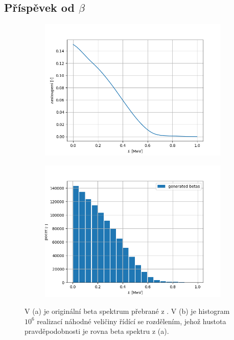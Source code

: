 \documentclass[11pt,a4paper]{article}
\begin{document}
\subsection{Příspěvek od $\beta$}
\begin{figure}[H]
	\centering
	\begin{subfigure}{0.49\textwidth}
		\centering
		\includegraphics[width=.99\textwidth]{betaSpektrum_Pb.png}
		\caption{}
	\end{subfigure}
	\begin{subfigure}{0.49\textwidth}
		\centering
		\includegraphics[width=.99\textwidth]{betaNahodnaCisla_Pb.png}
		\caption{}
	\end{subfigure}
\caption{V (a) je originální beta spektrum  přebrané z \cite{betaSpektrum}. V (b) je histogram $10^6$ realizací náhodné veličiny řídící se rozdělením, jehož hustota pravděpodobnosti je rovna beta spektru z (a).}
\end{figure}
\end{document}
